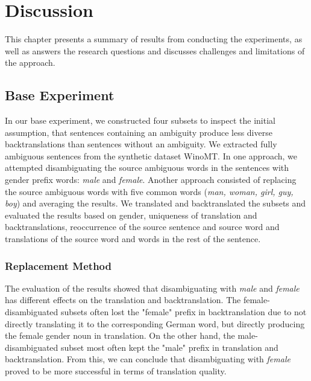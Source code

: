 \chapter{Discussion}
\label{ch:Discussion}

This chapter presents a summary of results from conducting the experiments, as well as answers the research questions and discusses challenges and limitations of the approach. 


\section{Base Experiment}
\label{sec:Discussion:Base}

In our base experiment, we constructed four subsets to inspect the initial assumption, that sentences containing an ambiguity produce less diverse backtranslations than sentences without an ambiguity. We extracted fully ambiguous sentences from the synthetic dataset WinoMT. In one approach, we attempted disambiguating the source ambiguous words in the sentences with gender prefix words: \textit{male} and \textit{female}. Another approach consisted of replacing the source ambiguous words with five common words (\textit{man, woman, girl, guy, boy}) and averaging the results. We translated and backtranslated the subsets and evaluated the results based on gender, uniqueness of translation and backtranslations, reoccurrence of the source sentence and source word and translations of the source word and words in the rest of the sentence.

\subsection{Replacement Method} %
The evaluation of the results showed that disambiguating with \textit{male} and \textit{female} has different effects on the translation and backtranslation. The female-disambiguated subsets often lost the "female" prefix in backtranslation due to not directly translating it to the corresponding German word, but directly producing the female gender noun in translation. On the other hand, the male-disambiguated subset most often kept the "male" prefix in translation and backtranslation. From this, we can conclude that disambiguating with \textit{female} proved to be more successful in terms of translation quality.

